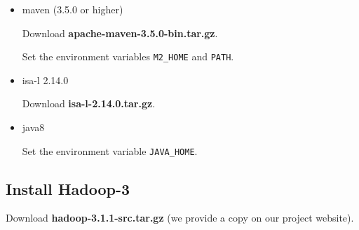 \documentclass[letterpaper,12pt]{article}
\begin{document}
\begin{itemize}
\item maven (3.5.0 or higher)

Download {\bf apache-maven-3.5.0-bin.tar.gz}.

\begin{center}
\noindent{}
\end{center}

Set the environment variables {\tt M2\_HOME} and {\tt PATH}.

\item isa-l 2.14.0

Download {\bf isa-l-2.14.0.tar.gz}.

\begin{center}
  \noindent{}
\end{center}

\item java8

\begin{center}
\noindent{}
\end{center}

Set the environment variable {\tt JAVA\_HOME}.

\end{itemize}

\subsection{Install Hadoop-3}

Download {\bf hadoop-3.1.1-src.tar.gz} (we provide a copy on our project website).

\begin{center}
\noindent{}
\end{center}
\end{document}
